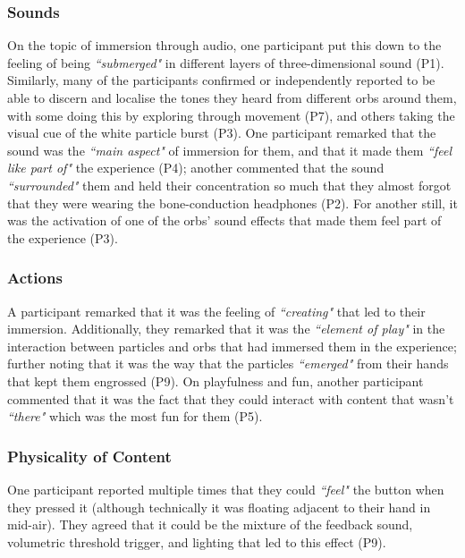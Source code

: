 \subsubsection{Sounds}\label{sec: polaris-feedback-immersion-sounds}
On the topic of immersion through audio, one participant put this down to the feeling of being \textit{``submerged"} in different layers of three-dimensional sound (P1). Similarly, many of the participants confirmed or independently reported to be able to discern and localise the tones they heard from different orbs around them, with some doing this by exploring through movement (P7), and others taking the visual cue of the white particle burst (P3). One participant remarked that the sound was the \textit{``main aspect"} of immersion for them, and that it made them \textit{``feel like part of"} the experience (P4); another commented that the sound \textit{``surrounded"} them and held their concentration so much that they almost forgot that they were wearing the bone-conduction headphones (P2). For another still, it was the activation of one of the orbs’ sound effects that made them feel part of the experience (P3).

\subsubsection{Actions}\label{sec: polaris-feedback-immersion-actions}
A participant remarked that it was the feeling of \textit{``creating"} that led to their immersion. Additionally, they remarked that it was the \textit{``element of play"} in the interaction between particles and orbs that had immersed them in the experience; further noting that it was the way that the particles \textit{``emerged"} from their hands that kept them engrossed (P9). On playfulness and fun, another participant commented that it was the fact that they could interact with content that wasn’t \textit{``there"} which was the most fun for them (P5).

\subsubsection{Physicality of Content}\label{sec: polaris-feedback-immersion-physicality}
One participant reported multiple times that they could \textit{``feel"} the button when they pressed it (although technically it was floating adjacent to their hand in mid-air). They agreed that it could be the mixture of the feedback sound, volumetric threshold trigger, and lighting that led to this effect (P9).

